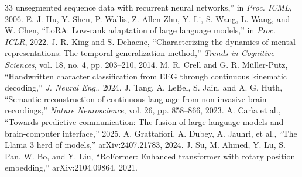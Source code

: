 \documentclass[conference]{IEEEtran}
\begin{document}
\begin{thebibliography}{33}
unsegmented sequence data with recurrent neural networks,'' in \emph{Proc.
ICML}, 2006.
 E. J. Hu, Y. Shen, P. Wallis, Z. Allen-Zhu, Y. Li,
S. Wang, L. Wang, and W. Chen, ``LoRA: Low-rank adaptation of large language
models,'' in \emph{Proc. ICLR}, 2022.
 J.-R. King and S. Dehaene, ``Characterizing the dynamics
of mental representations: The temporal generalization method,''
\emph{Trends in Cognitive Sciences}, vol. 18, no. 4, pp. 203--210, 2014.
 M. R. Crell and G. R. M\"uller-Putz, ``Handwritten
character classification from EEG through continuous kinematic decoding,''
\emph{J. Neural Eng.}, 2024.
 J. Tang, A. LeBel, S. Jain, and A. G. Huth, ``Semantic
reconstruction of continuous language from non-invasive brain recordings,''
\emph{Nature Neuroscience}, vol. 26, pp. 858--866, 2023.
 A. Car\`ia et al., ``Towards predictive communication:
The fusion of large language models and brain-computer interface,'' 2025.
 A. Grattafiori, A. Dubey, A. Jauhri, et al., ``The Llama 3
herd of models,'' arXiv:2407.21783, 2024.
 J. Su, M. Ahmed, Y. Lu, S. Pan, W. Bo, and Y. Liu,
``RoFormer: Enhanced transformer with rotary position embedding,''
arXiv:2104.09864, 2021.
\end{thebibliography}
\end{document}
